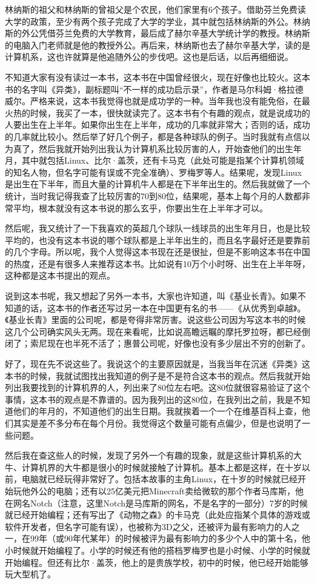 \documentclass[
  letterpaper,
  DIV=11,
  numbers=noendperiod]{scrreprt}
\begin{document}
林纳斯的祖父和林纳斯的曾祖父是个农民，他们家里有6个孩子。借助芬兰免费读大学的政策，至少有两个孩子完成了大学的学业，其中就包括林纳斯的外公。林纳斯的外公凭借芬兰免费的大学教育，最后成了赫尔辛基大学统计学的教授。林纳斯的电脑入门老师就是他的教授外公。再后来，林纳斯也去了赫尔辛基大学，读的是计算机系，这也许就算是他追随外公的步伐吧。这也是后话，以后再细细说。

不知道大家有没有读过一本书，这本书在中国曾经很火，现在好像也比较火。这本书的名字叫《异类》，副标题叫``不一样的成功启示录''，作者是马尔科姆·格拉德威尔。严格来说，这本书我觉得也就是成功学的一种。当年我也没有能免俗，在最火热的时候，我买了一本，很快就读完了。这本书有个有趣的观点，就是说成功的人要出生在上半年。如果你出生在上半年，成功的几率就非常大；否则的话，成功的几率就比较小。然后举了好几个例子，都是各种球队的例子。当时我就有点信以为真了，然后我就开始列出我认为计算机系比较厉害的人，开始查他们的出生年月，其中就包括Linux、比尔·盖茨，还有卡马克（此处可能是指某个计算机领域的知名人物，但名字可能有误或不完全准确）、罗梅罗等人。结果呢，发现Linux是出生在下半年，而且大量的计算机牛人都是在下半年出生的。然后我就做了一个统计，当时我记得我查了比较厉害的70到80位，结果呢，基本上每个月的人数都非常平均，根本就没有这本书说的那么玄乎，你要出生在上半年才可以。

然后呢，我又统计了一下我喜欢的英超几个球队一线球员的出生年月日，也是比较平均的，也没有这本书说的哪个球队都是上半年出生的，而且名字最好还是要靠前的几个字母。所以呢，我个人觉得这本书现在还是很扯，但是不影响这本书在中国的热度，还是有很多人来推荐这本书。比如说有10万个小时呀、出生在上半年呀，这种都是这本书提出的观点。

说到这本书呢，我又想起了另外一本书，大家也许知道，叫《基业长青》。如果不知道的话，这本书的作者还写过另一本在中国更有名的书------《从优秀到卓越》。《基业长青》里面的公司呢，都是夸得非常厉害。说这些公司因为写这本书的时候这几个公司确实风头无两。现在来看呢，比如说高瞻远瞩的摩托罗拉呀，都已经倒闭了；索尼现在也半死不活了；惠普公司呢，好像也没有多少层出不穷的创新了。

好了，现在先不说这些了。我说这个的主要原因就是，当我当年在沉迷《异类》这本书的时候，我就试图找出我知道的例子是不是符合这本书的观点。然后我就开始列出我要找到的计算机界的人，列出来了80位左右吧。这80位就很容易验证了这个事情，这本书的观点是不靠谱的。因为我列出的这80位，在我列出之前，我是不知道他们的年月的，不知道他们的出生日期。我就挨着一个一个在维基百科上查，他们其实是差不多分布在每个月份。我觉得这个数量可能有点偏少，但是也说明了一些问题。

然后我在查这些人的时候，发现了另外一个有趣的现象，就是这些计算机系的大牛、计算机界的大牛都是很小的时候就接触了计算机。基本上都是这样，在十岁以前，电脑就已经玩得非常好了。包括本故事的主角Linux，在十岁的时候就已经开始玩他外公的电脑；还有以25亿美元把Minecraft卖给微软的那个作者马库斯，他在网名Notch（注意，这里Notch是马库斯的网名，不是名字的一部分）7岁的时候就已经开始编程；还有写出了《动物之森》的卡马克（此处应指某个具体的游戏或软件开发者，但名字可能有误），也被称为3D之父，还被评为最有影响力的人之一，在99年（或90年代某年）的时候被评为最有影响力的多少个人中的第十名，他小时候就开始编程了。小学的时候还有他的搭档罗梅罗也是小时候、小学的时候就开始编程。但还有比尔·盖茨，他上的是贵族学校，初中的时候，他已经开始能够玩大型机了。
\end{document}
